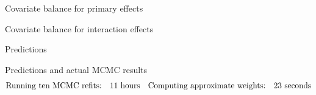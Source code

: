 


\begin{frame}{Covariate balance for primary effects}
\LaxImbalancePrimary{}
\end{frame}


\begin{frame}{Covariate balance for interaction effects}
\LaxImbalanceInteraction{}
\end{frame}




\begin{frame}[t]{Predictions}
    \LaxPredictionFigOne{}
\end{frame}


\begin{frame}[t]{Predictions and actual MCMC results}
    \LaxPredictionFigTwo{}
    \vspace{-3em}
    $$
    \begin{aligned}
        \textrm{Running ten MCMC refits:}\quad & 11 \textrm{ hours} &
        \textrm{Computing approximate weights:}\quad &23 \textrm{ seconds}\\
    \end{aligned}
    $$
\end{frame}







\def\res{\varepsilon}
\def\w{w}
\def\wtil{\tilde{\w}}
\def\reshat{\hat{\res}}

\def\methodrow#1#2#3{
\begin{minipage}[t]{0.15\textwidth}
    \centering
    #1
\end{minipage}
\hfill
\begin{minipage}[t]{0.4\textwidth}
    \centering
    \vspace{-2em}
    #2
    \pause
\end{minipage}
\hfill
\begin{minipage}[t]{0.4\textwidth}
    \centering
    \vspace{-2em}
    #3
    \pause
\end{minipage}
}



